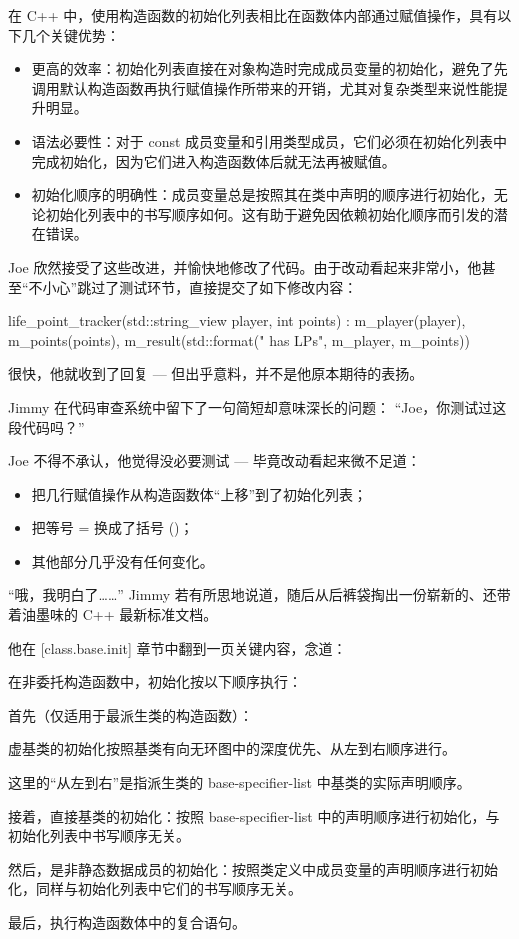 在 C++ 中，使用构造函数的初始化列表相比在函数体内部通过赋值操作，具有以下几个关键优势：

\begin{itemize}
\item 
更高的效率：初始化列表直接在对象构造时完成成员变量的初始化，避免了先调用默认构造函数再执行赋值操作所带来的开销，尤其对复杂类型来说性能提升明显。

\item 
语法必要性：对于 const 成员变量和引用类型成员，它们必须在初始化列表中完成初始化，因为它们进入构造函数体后就无法再被赋值。

\item 
初始化顺序的明确性：成员变量总是按照其在类中声明的顺序进行初始化，无论初始化列表中的书写顺序如何。这有助于避免因依赖初始化顺序而引发的潜在错误。
\end{itemize}

Joe 欣然接受了这些改进，并愉快地修改了代码。由于改动看起来非常小，他甚至“不小心”跳过了测试环节，直接提交了如下修改内容：

\begin{cpp}
life_point_tracker(std::string_view player, int points)
: m_player(player), m_points(points),
  m_result(std::format("{} has {} LPs", m_player, m_points)) {}
\end{cpp}


很快，他就收到了回复 --- 但出乎意料，并不是他原本期待的表扬。

Jimmy 在代码审查系统中留下了一句简短却意味深长的问题： “Joe，你测试过这段代码吗？”

Joe 不得不承认，他觉得没必要测试 --- 毕竟改动看起来微不足道：

\begin{itemize}
\item 
把几行赋值操作从构造函数体“上移”到了初始化列表；

\item 
把等号 = 换成了括号 ()；

\item 
其他部分几乎没有任何变化。
\end{itemize}

“哦，我明白了……” Jimmy 若有所思地说道，随后从后裤袋掏出一份崭新的、还带着油墨味的 C++ 最新标准文档。

他在 [class.base.init] 章节中翻到一页关键内容，念道：

\begin{shell}
在非委托构造函数中，初始化按以下顺序执行：

首先（仅适用于最派生类的构造函数）：

虚基类的初始化按照基类有向无环图中的深度优先、从左到右顺序进行。

这里的“从左到右”是指派生类的 base-specifier-list 中基类的实际声明顺序。

接着，直接基类的初始化：按照 base-specifier-list 中的声明顺序进行初始化，与初始化列表中书写顺序无关。

然后，是非静态数据成员的初始化：按照类定义中成员变量的声明顺序进行初始化，同样与初始化列表中它们的书写顺序无关。

最后，执行构造函数体中的复合语句。
\end{shell}

